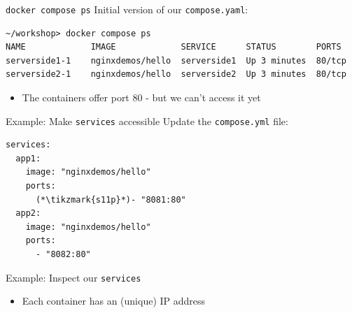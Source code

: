 \begin{frame}[fragile]{\texttt{docker compose ps}}
  Initial version of our \texttt{compose.yaml}:
  \begin{termbox}
\begin{lstlisting}[style=wstermstyle, basicstyle=\ttfamily\scriptsize\color{wsgreen}]
~/workshop> docker compose ps
NAME             IMAGE             SERVICE      STATUS        PORTS
serverside1-1    nginxdemos/hello  serverside1  Up 3 minutes  80/tcp
serverside2-1    nginxdemos/hello  serverside2  Up 3 minutes  80/tcp
\end{lstlisting}
  \end{termbox}
  \begin{itemize}
    \item The containers offer port 80 - but we can't access it yet
  \end{itemize}
\end{frame}

\begin{frame}[fragile]{Example: Make \texttt{services} accessible}
  Update the \texttt{compose.yml} file:
  \begin{yamlbox}
\begin{lstlisting}[style=wsyamlstyle]
services:
  app1:
    image: "nginxdemos/hello"
    ports:
      (*\tikzmark{s11p}*)- "8081:80"
  app2:
    image: "nginxdemos/hello"
    ports:
      - "8082:80"
\end{lstlisting}
  \end{yamlbox}
\end{frame}

\begin{frame}{Example: Inspect our \texttt{services}}
  \begin{itemize}\item Each container has an (unique) IP address\end{itemize}
  \vfill\centering
  \begin{columns}[c]
    \centering{}
    \centering{}
  \end{columns}
  \vfill
\end{frame}

